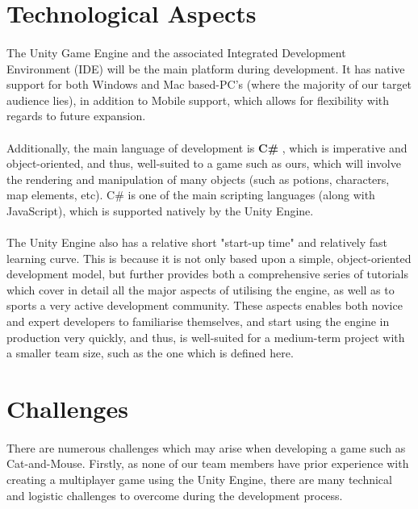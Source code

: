 \documentclass{article}
\begin{document}
\section{Technological Aspects}

\paragraph{}The Unity Game Engine and the associated Integrated Development Environment (IDE)  will be the main platform during development. It has native support for both Windows and Mac based-PC’s (where the majority of our target audience lies), in
addition to Mobile support, which allows for flexibility with regards to future expansion.

\paragraph{}Additionally, the main language of development is \textbf{C\#} , which is imperative and object-oriented, and
thus, well-suited to a game such as ours, which will involve the rendering and manipulation of many objects
(such as potions, characters, map elements, etc). C\# is one of the main scripting languages (along with JavaScript), which is supported natively by the Unity Engine.

\paragraph{}The Unity Engine also has a relative short "start-up time" and relatively fast learning curve. This is because it is not only based upon a simple, object-oriented development model, but further provides both a comprehensive series of tutorials which cover in detail all the major aspects of utilising the engine, as well as to sports a very active development community. These aspects enables both novice and expert developers to familiarise themselves, and start using the engine in production very quickly, and thus, is well-suited for a medium-term project with a smaller team size, such as the one which is defined here.

\section{Challenges}

\paragraph{}There are numerous challenges which may arise when developing a game such as Cat-and-Mouse. Firstly, as none of our team members have prior experience with creating a multiplayer game using the Unity Engine, there are many technical and logistic challenges to overcome during the development process.
\end{document}
